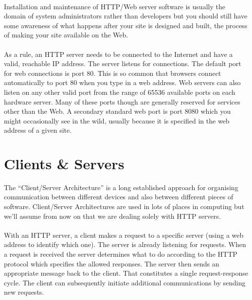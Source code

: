 \paragraph{} Installation and maintenance of HTTP/Web server software is usually the domain of system administrators rather than developers but you should still have some awareness of what happens after your site is designed and built, the process of making your site available on the Web.
\paragraph{} As a rule, an HTTP server needs to be connected to the Internet and have a valid, reachable IP address. The server listens for connections. The default port for web connections is port 80. This is so common that browsers connect automatically to port 80 when you type in a web address. Web servers can also listen on any other valid port from the range of 65536 available ports on each hardware server. Many of these ports though are generally reserved for services other than the Web. A secondary standard web port is port 8080 which you might occasionally see in the wild, usually because it is specified in the web address of a given site.

\section{Clients \& Servers}
\paragraph{} The ``Client/Server Architecture'' is a long established approach for organising communication between different devices and also between different pieces of software. Client/Server Architectures are used in lots of places in computing but we’ll assume from now on that we are dealing solely with HTTP servers.
\paragraph{} With an HTTP server, a client makes a request to a specific server (using a web address to identify which one). The server is already listening for requests. When a request is received the server determines what to do according to the HTTP protocol which specifies the allowed responses. The server then sends an appropriate message back to the client. That constitutes a single request-response cycle. The client can subsequently initiate additional communications by sending new requests.
